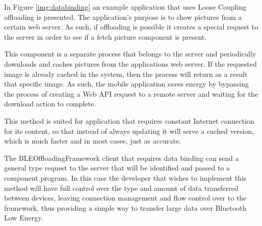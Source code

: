 In Figure \ref{img:databinding} an example application that uses Loose Coupling offloading is presented. The application's purpose is to show pictures from a certain web server. As such, if offloading is possible it creates a special request to the server in order to see if a fetch picture component is present.

This component is a separate process that belongs to the server and periodically downloads and caches pictures from the applications web server. If the requested image is already cached in the system, then the process will return as a result that specific image. As such, the mobile application saves energy by bypassing the process of creating a Web API request to a remote server and waiting for the download action to complete.

This method is suited for application that requires constant Internet connection for its content, so that instead of always updating it will serve a cached version, which is much faster and in most cases, just as accurate. 

The BLEOffloadingFramework client that requires data binding can send a general type request to the server that will be identified and passed to a component program. In this case the developer that wishes to implement this method will have full control over the type and amount of data transferred between devices, leaving connection management and flow control over to the framework, thus providing a simple way to transfer large data over Bluetooth Low Energy.